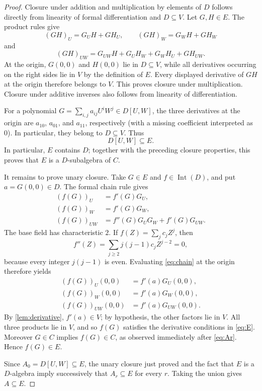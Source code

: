 \documentclass[11pt,reqno]{amsart}
\numberwithin{equation}{section}
\theoremstyle{plain}
\theoremstyle{definition}
\theoremstyle{remark}
\newcommand{\Int}{\operatorname{Int}}
\begin{document}
\begin{proof}
Closure under addition and multiplication by elements of \(D\) follows
directly from linearity of formal differentiation and \(D\subseteq V\).
Let \(G,H\in E\).  The product rules give
\[
 (GH)_U=G_UH+GH_U,\qquad
 (GH)_W=G_WH+GH_W
\]
and
\begin{equation}
 (GH)_{UW}
  =G_{UW}H+G_UH_W+G_WH_U+GH_{UW}.
 \label{eq:product-mixed}
\end{equation}
At the origin, \(G(0,0)\) and \(H(0,0)\) lie in \(D\subseteq V\),
while all derivatives occurring on the right sides lie in \(V\) by
the definition of \(E\).  Every displayed derivative of \(GH\) at the
origin therefore belongs to \(V\).  This proves closure under
multiplication.  Closure under additive inverses also follows from
linearity of differentiation.

For a polynomial
\(G=\sum_{i,j}a_{ij}U^iW^j\in D[U,W]\), the three derivatives at the
origin are \(a_{10}\), \(a_{01}\), and \(a_{11}\), respectively (with
a missing coefficient interpreted as \(0\)).  In particular, they
belong to \(D\subseteq V\).
Thus
\[
 D[U,W]\subseteq E.
\]
In particular, \(E\) contains \(D\); together with the preceding
closure properties, this proves that \(E\) is a \(D\)-subalgebra of
\(C\).

It remains to prove unary closure.  Take \(G\in E\) and
\(f\in\Int(D)\), and put \(a=G(0,0)\in D\).  The formal chain rule
gives
\begin{equation}
 \begin{aligned}
 (f(G))_U&=f'(G)G_U,\\
 (f(G))_W&=f'(G)G_W,\\
 (f(G))_{UW}
   &=f''(G)G_UG_W+f'(G)G_{UW}.
 \end{aligned}
 \label{eq:chain}
\end{equation}
The base field has characteristic \(2\).  If
\(f(Z)=\sum_j c_jZ^j\), then
\[
 f''(Z)=\sum_{j\geq2}j(j-1)c_jZ^{j-2}=0,
\]
because every integer \(j(j-1)\) is even.  Evaluating
\eqref{eq:chain} at the origin therefore yields
\[
 \begin{aligned}
 (f(G))_U(0,0)&=f'(a)G_U(0,0),\\
 (f(G))_W(0,0)&=f'(a)G_W(0,0),\\
 (f(G))_{UW}(0,0)&=f'(a)G_{UW}(0,0).
 \end{aligned}
\]
By \cref{lem:derivative}, \(f'(a)\in V\); by hypothesis, the other
factors lie in \(V\).  All three products lie in \(V\), and so
\(f(G)\) satisfies the derivative conditions in \eqref{eq:E}.
Moreover \(G\in C\) implies \(f(G)\in C\), as observed immediately
after \eqref{eq:Ar}.  Hence \(f(G)\in E\).

Since \(A_0=D[U,W]\subseteq E\), the unary closure just proved and the
fact that \(E\) is a \(D\)-algebra imply successively that
\(A_r\subseteq E\) for every \(r\).  Taking the union gives
\(A\subseteq E\).
\end{proof}
\end{document}
